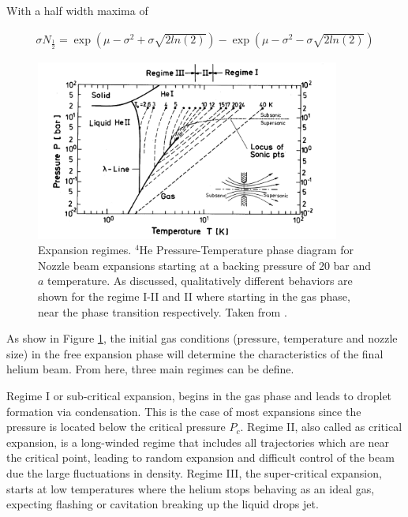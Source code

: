 With a half width maxima of \cite{harms_density_1998}

\begin{align}
\sigma N_{\frac{1}{2}} = \exp \left( \mu - \sigma ^2 + \sigma \sqrt{2 ln(2)} \right) - \exp \left(  \mu - \sigma ^2 - \sigma \sqrt{2 ln(2)}  \right)
\end{align}

\begin{figure}[h!]
\centering
\includegraphics[width= 10cm]{../Images/expansion_regimes.PNG}
\caption[Phase diagram for Expansion regimens]{Expansion regimes. $^{4}$He Pressure-Temperature phase diagram for Nozzle beam expansions starting at a backing pressure  of 20 bar and $a$ temperature. As discussed, qualitatively different behaviors are shown for the regime I-II and II where starting in the gas phase,  near the phase transition respectively. Taken from \cite{buchenau_mass_1990}. }
\label{fig:ExpRegim}
\end{figure}

As show in Figure \ref{fig:ExpRegim}, the initial gas conditions (pressure, temperature and nozzle size) in the free expansion phase will determine the characteristics of the final helium beam. From here, three main regimes can be define.

Regime I or sub-critical expansion, begins in the gas phase and leads to droplet formation via condensation. This is the case of most expansions since the pressure is located below the critical pressure $P_{c}$.
Regime II, also called as critical expansion, is a long-winded regime that includes all trajectories which are near the critical point, leading to random expansion and difficult control of the beam due the large fluctuations in density.
Regime III, the super-critical expansion, starts at low temperatures where the helium stops behaving as an ideal gas, expecting flashing or cavitation  breaking up the liquid drops jet. \cite{buchenau_mass_1990}


